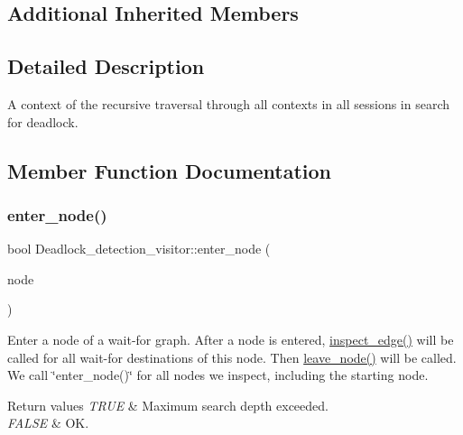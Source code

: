\subsection*{Additional Inherited Members}


\subsection{Detailed Description}
A context of the recursive traversal through all contexts in all sessions in search for deadlock. 

\subsection{Member Function Documentation}
\mbox{\label{classDeadlock__detection__visitor_a770352475b3110f6fed5d7cd621ca113}} 
\subsubsection{\texorpdfstring{enter\+\_\+node()}{enter\_node()}}
{\footnotesize\ttfamily bool Deadlock\+\_\+detection\+\_\+visitor\+::enter\+\_\+node (\begin{DoxyParamCaption}\item[{\mbox{\hyperlink{classMDL__context}{M\+D\+L\+\_\+context}} $\ast$}]{node }\end{DoxyParamCaption})\hspace{0.3cm}{\ttfamily [virtual]}}

Enter a node of a wait-\/for graph. After a node is entered, \mbox{\hyperlink{classDeadlock__detection__visitor_a5026f36978b470869539c8171ad26875}{inspect\+\_\+edge()}} will be called for all wait-\/for destinations of this node. Then \mbox{\hyperlink{classDeadlock__detection__visitor_aa56aca6948788aeb22c760d783884d7b}{leave\+\_\+node()}} will be called. We call \char`\"{}enter\+\_\+node()\char`\"{} for all nodes we inspect, including the starting node.


\begin{DoxyRetVals}{Return values}
{\em T\+R\+UE} & Maximum search depth exceeded. \\
\hline
{\em F\+A\+L\+SE} & OK. \\
\hline
\end{DoxyRetVals}


